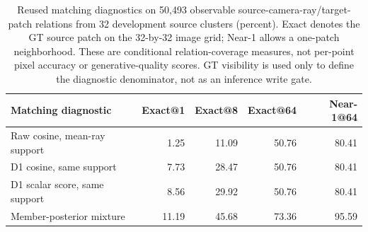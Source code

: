\begin{table}[t]
\centering\small
\begin{tabular}{lrrrr}
\toprule
Matching diagnostic&Exact@1&Exact@8&Exact@64&Near-1@64\\
\midrule
Raw cosine, mean-ray support&1.25&11.09&50.76&80.41\\
D1 cosine, same support&7.73&28.47&50.76&80.41\\
D1 scalar score, same support&8.56&29.92&50.76&80.41\\
Member-posterior mixture&11.19&45.68&73.36&95.59\\
\bottomrule
\end{tabular}
\caption{Reused matching diagnostics on 50,493 observable source-camera-ray/target-patch relations from 32 development source clusters (percent). Exact denotes the GT source patch on the 32-by-32 image grid; Near-1 allows a one-patch neighborhood. These are conditional relation-coverage measures, not per-point pixel accuracy or generative-quality scores. GT visibility is used only to define the diagnostic denominator, not as an inference write gate.}
\label{tab:matching-diagnostic}
\end{table}
